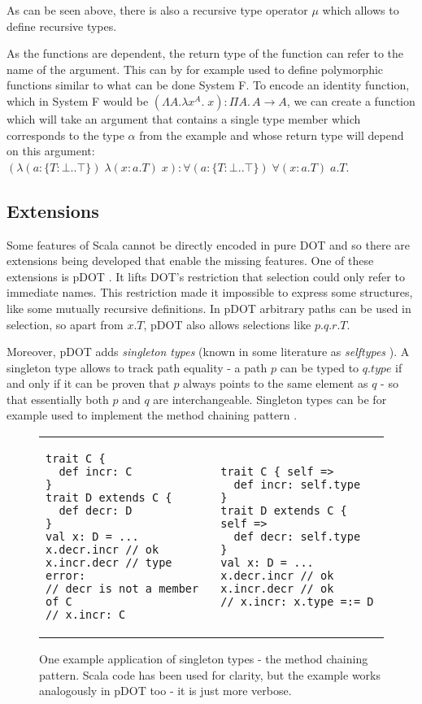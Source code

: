 As can be seen above, there is also a recursive type operator $\mu$ which allows to define recursive types.

As the functions are dependent, the return type of the function can refer to the name of the argument. This can by for example used to define polymorphic functions similar to what can be done System F. To encode an identity function, which in System F would be $(\Lambda A. \lambda x^A . \; x) : \Pi A. \, A \to A$, we can create a function which will take an argument that contains a single type member which corresponds to the type $\alpha$ from the example and whose return type will depend on this argument: \\ $(\lambda (a : \{ T : \bot..\top \}) \; \lambda (x: a.T) \; x) : \forall (a : \{ T : \bot..\top \}) \; \forall (x : a.T) \; a.T$.

\subsection{Extensions}

Some features of Scala cannot be directly encoded in pure DOT and so there are extensions being developed that enable the missing features. One of these extensions is pDOT \cite{pDOT}. It lifts DOT's restriction that selection could only refer to immediate names. This restriction made it impossible to express some structures, like some mutually recursive definitions. In pDOT arbitrary paths can be used in selection, so apart from $x.T$, pDOT also allows selections like $p.q.r.T$. 

Moreover, pDOT adds \textit{singleton types} (known in some literature as \textit{selftypes} \cite{zenger}). A singleton type allows to track path equality - a path $p$ can be typed to $q.type$ if and only if it can be proven that $p$ always points to the same element as $q$ - so that essentially both $p$ and $q$ are interchangeable. Singleton types can be for example used to implement the method chaining pattern \cite{pDOT}.

\begin{figure}[h]
\caption{One example application of singleton types - the method chaining pattern. Scala code has been used for clarity, but the example works analogously in pDOT too - it is just more verbose.}
\begin{tabular}{p{} p{}}
\begin{verbatim}
trait C {
  def incr: C
}
trait D extends C {
  def decr: D
}
val x: D = ...
x.decr.incr // ok
x.incr.decr // type error:
// decr is not a member of C
// x.incr: C
\end{verbatim}
    &
\begin{verbatim}
trait C { self =>
  def incr: self.type
}
trait D extends C { self =>
  def decr: self.type
}
val x: D = ...
x.decr.incr // ok
x.incr.decr // ok
// x.incr: x.type =:= D
\end{verbatim}
\end{tabular}  
\end{figure}



